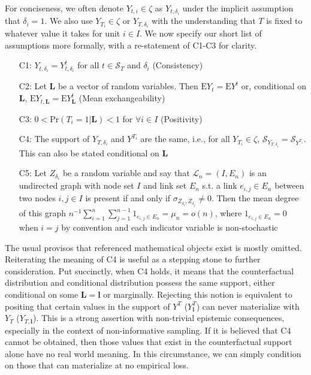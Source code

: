 \documentclass[12pt]{amsart}
\theoremstyle{plain}%
\theoremstyle{definition}
\theoremstyle{remark}
\numberwithin{equation}{section}
\begin{document}
For conciseness, we often denote $Y_{t, i} \in \zeta$ as $Y_{t, \delta_i}$ under the implicit assumption that $\delta_i = 1$. We also use $Y_{T_i} \in \zeta$ or $Y_{T, \delta_i}$ with the understanding that $T$ is fixed to whatever value it takes for unit $i \in I$. We now specify our short list of assumptions more formally, with a re-statement of C1-C3 for clarity.
\begin{enumerate}
\item[C1:] $Y_{t, \delta_i} = Y^t_{t, \delta_i}$ for all $t \in \mathcal{S}_T$ and $\delta_i$ (Consistency)
\item[C2:] Let $\mathbf{L}$ be a vector of random variables. Then $\text{E}Y_t = \text{E}Y^t$ or, conditional on $\mathbf{L}$, $\text{E}Y_{t, \mathbf{L}} = \text{E}Y_{\mathbf{L}}^t$ (Mean exchangeability)
\item[C3:] $0 < \text{Pr}(T_i = 1 | \mathbf{L}) < 1$ for $\forall i \in I$ (Positivity)
\item[C4:] The support of $Y_{T, \delta_i}$ and $Y^{T_i}$ are the same, i.e., for all $Y_{T_i} \in \zeta$, $\mathcal{S}_{Y_{T, \delta_i}} = \mathcal{S}_{Y^{T_i}}$. This can also be stated conditional on $\mathbf{L}$
\item[C5:] Let $Z_{\delta_i}$ be a random variable and say that $\mathcal{L}_n =(I, E_n)$ is an undirected graph with node set $I$ and link set $E_n$ s.t. a link $e_{i, j} \in E_n$ between two nodes $i, j \in I$ is present if and only if $\sigma_{Z_{\delta_i}, Z_{\delta_j}} \neq 0$. Then the mean degree of this graph $n^{-1} \sum_{i=1}^n \sum_{j =1 }^{n-1} 1_{e_{i, j} \in E_n} =\mu_n =o(n)$, where $1_{e_{i, j} \in E_n} = 0$ when $i=j$ by convention and each indicator variable is non-stochastic
\end{enumerate}
The usual provisos that referenced mathematical objects exist is mostly omitted. Reiterating the meaning of C4 is useful as a stepping stone to further consideration. Put succinctly, when C4 holds, it means that the counterfactual distribution and conditional distribution possess the same support, either conditional on some $\mathbf{L} = \mathbf{l}$ or marginally. Rejecting this notion is equivalent to positing that certain values in the support of $Y^T$ ($Y_{\mathbf{l}}^T$) can never materialize with $Y_T$ ($Y_{T, \mathbf{l}}$). This is a strong assertion with non-trivial epistemic consequences, especially in the context of non-informative sampling. If it is believed that C4 cannot be obtained, then those values that exist in the counterfactual support alone have no real world meaning. In this circumstance, we can simply condition on those that can materialize at no empirical loss. 
\end{document}

